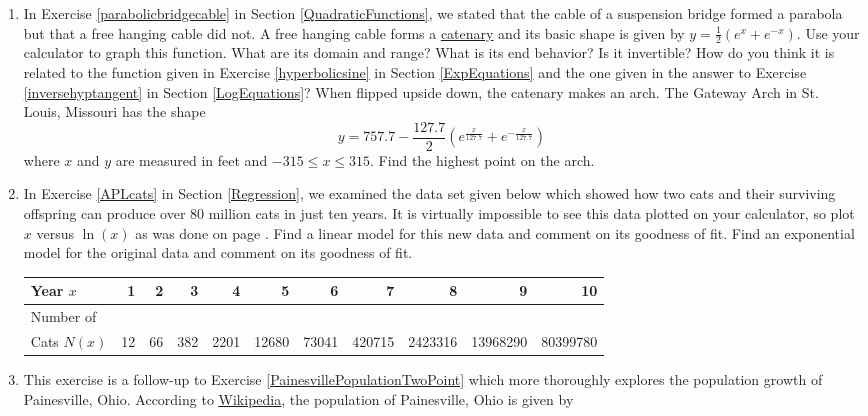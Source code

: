 \begin{enumerate}
\item \label{catenary} In Exercise \ref{parabolicbridgecable} in Section \ref{QuadraticFunctions}, we stated that the cable of a suspension bridge formed a parabola but that a free hanging cable did not.  A free hanging cable forms a \underline{catenary} and its basic shape is given by $y = \frac{1}{2}\left(e^{x} + e^{-x}\right)$.  Use your calculator to graph this function.  What are its domain and range?  What is its end behavior?  Is it invertible?  How do you think it is related to the function given in Exercise \ref{hyperbolicsine} in Section \ref{ExpEquations} and the one given in the answer to Exercise \ref{inversehyptangent} in Section \ref{LogEquations}?  When flipped upside down, the catenary makes an arch.  The Gateway Arch in St. Louis, Missouri has the shape \[y = 757.7 - \frac{127.7}{2}\left(e^{\frac{x}{127.7}} + e^{-\frac{x}{127.7}}\right)\] where $x$ and $y$ are measured in feet and $-315 \leq x \leq 315$.  Find the highest point on the arch.

\item In Exercise \ref{APLcats} in Section \ref{Regression}, we examined the data set given below which showed how two cats and their surviving offspring can produce over 80 million cats in just ten years.  It is virtually impossible to see this data plotted on your calculator, so plot $x$ versus $\ln(x)$ as was done on page \pageref{swineflulinearized}.  Find a linear model for this new data and comment on its goodness of fit.  Find an exponential model for the original data and comment on its goodness of fit.

\medskip

\small

\noindent \begin{tabular}{|l|r|r|r|r|r|r|r|r|r|r|} \hline
Year $x$ & 1 & 2 & 3 & 4 & 5 & 6 & 7 & 8 & 9 & 10 \\ 
\hline 
Number of  & & & & & & & & & & \\
Cats $N(x)$ & 12 & 66 & 382 & 2201 & 12680 & 73041 & 420715 & 2423316 & 13968290 & 80399780 \\ \hline
\end{tabular}

\normalsize


\item  \label{PainesvillePopulationManyPoints} This exercise is a follow-up to Exercise \ref{PainesvillePopulationTwoPoint} which more thoroughly explores the population growth of Painesville, Ohio.  According to \href{http://en.wikipedia.org/wiki/Painesville}{\underline{Wikipedia}}, the population of Painesville, Ohio is given by



\end{enumerate}
